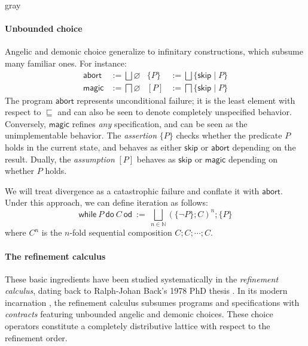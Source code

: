 \documentclass[format=sigplan,authordraft]{acmart}
\newcommand{\kw}[1]{\ensuremath{ \mathsf{#1} }}
\begin{document}

\begin{color}{gray}
\paragraph{Unbounded choice} %

Angelic and demonic choice
generalize to infinitary constructions,
which subsume many familiar ones.
For instance:
\begin{align*}
  \kw{abort} &:= \bigsqcup \varnothing &
  \{ P \} &:= \bigsqcup \{ \kw{skip} \mid P \} \\
  \kw{magic} &:= \bigsqcap \varnothing &
  [ P ] &:= \bigsqcap \{ \kw{skip} \mid P \}
\end{align*}
The program $\kw{abort}$ represents unconditional failure;
it is the least element with respect to $\sqsubseteq$
and can also be seen to denote completely unspecified behavior.
Conversely, $\kw{magic}$ refines \emph{any} specification,
and can be seen as the unimplementable behavior.
The \emph{assertion} $\{P\}$ checks whether
the predicate $P$ holds in the current state,
and behaves as either $\kw{skip}$ or $\kw{abort}$
depending on the result.
Dually, the \emph{assumption} $[P]$ behaves as
$\kw{skip}$ or $\kw{magic}$ depending on whether $P$ holds.

We will treat divergence as a catastrophic failure
and conflate it with \kw{abort}.
Under this approach,
we can define iteration as follows:
\[
  \kw{while} \: P \: \kw{do} \: C \: \kw{od} \: := \:
    \bigsqcup_{n \in \mathbb{N}}
    (\{\neg P\}; C)^n ; \{P\}
\]
where $C^n$ is the $n$-fold sequential composition
$C ; C ; \cdots ; C$.


\end{color}

\paragraph{The refinement calculus} %

These basic ingredients have been studied systematically
in the \emph{refinement calculus},
dating back to Ralph-Johan Back's 1978 PhD thesis \cite{backthesis}.
In its modern incarnation \cite{refcal},
the refinement calculus
subsumes programs and specifications with \emph{contracts}
featuring unbounded angelic and demonic choices.
These choice operators
constitute a completely distributive lattice
with respect to the refinement order.
\end{document}
